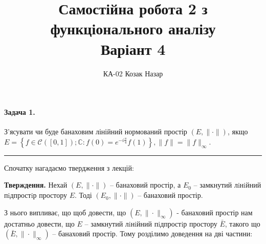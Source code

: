 \documentclass[a5paper, 20pt, titlepage]{article}
\title{Самостійна робота 2 з функціонального аналізу \\ Варіант 4}
\author{\vspace{-4mm} КА-02 Козак Назар}
\date{}
\begin{document}
\maketitle


\paragraph{Задача 1.} \hfill \nolinebreak З'ясувати чи буде банаховим лінійний нормований простір $\left( E, \| \cdot \| \right)$, якщо \newline
$E = \left\{ f \in \mathcal{C}\left([0, 1] \right); \mathbb{C} : f(0)  = e^{-i \frac{\pi}{4}} f(1) \right\}, \| f \| = \| f \|_{\infty}$.

\noindent\rule{4cm}{0.4pt}

Спочатку нагадаємо твердження з лекцій:

\vspace{4mm}
\textbf{Тверждення.} \quad Нехай $\left( E, \| \cdot \| \right)$ -- банаховий простір, а $E_0$ -- замкнутий лiнiйний пiдпростiр простору $E$.
Тоді $\left( E_0, \| \cdot \| \right)$ -- банаховий простір. 
\vspace{4mm}

З нього випливає, що щоб довести, що  $\left( E, \| \cdot \|_\infty \right)$ - банаховий простір нам достатньо довести, що $E$ -- замкнутий лiнiйний пiдпростiр простору $\bar E$, такого що $\left(\bar E, \| \cdot \|_\infty \right)$ -- банаховий простір. Тому розділимо доведення на дві частини:
\end{document}
